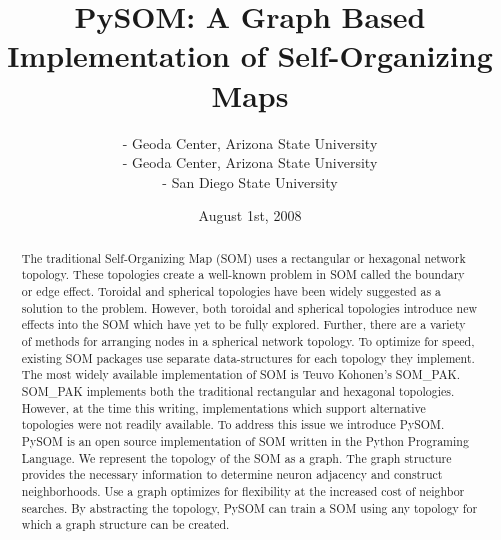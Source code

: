 \documentclass[11pt]{article}
\begin{document}
\title{PySOM: A Graph Based Implementation of Self-Organizing Maps}
\author{ - Geoda Center, Arizona State University\\
	 - Geoda Center, Arizona State University\\
	 - San Diego State University}

\date{August 1st, 2008}
\maketitle
\begin{abstract}
The traditional Self-Organizing Map (SOM) uses a rectangular or hexagonal
network topology.  These topologies create a well-known problem in SOM called
the boundary or edge effect.  Toroidal and spherical topologies have been
widely suggested as a solution to the problem.  However, both toroidal and
spherical topologies introduce new effects into the SOM which have yet to be
fully explored.  Further, there are a variety of methods for arranging nodes
in a spherical network topology.  To optimize for speed, existing SOM packages
use separate data-structures for each topology they implement.  The most
widely available implementation of SOM is Teuvo Kohonen's SOM\_PAK.  SOM\_PAK
implements both the traditional rectangular and hexagonal topologies.
However, at the time this writing, implementations which support alternative
topologies were not readily available.  To address this issue we introduce
PySOM.  PySOM is an open source implementation of SOM written in the Python
Programing Language. We represent the topology of the SOM as a graph. The
graph structure provides the necessary information to determine neuron
adjacency and construct neighborhoods.  Use a graph optimizes for flexibility
at the increased cost of neighbor searches. By abstracting the topology, PySOM
can train a SOM using any topology for which a graph structure can be created.

\end{abstract}
\end{document}
